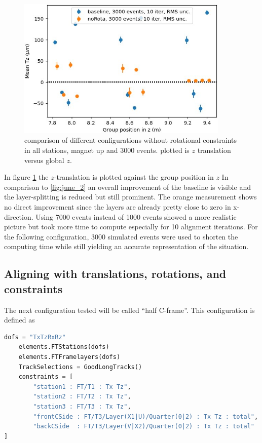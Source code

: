 \begin{figure}
  \centering
  \includegraphics[width=0.9\textwidth]{plots/renewed_plots/lxplus/4_4.jpeg}
  \caption{comparison of different configurations without rotational constraints in all stations, magnet up and 3000 events. plotted is $z$ translation versus global $z$.}
  \label{fig:june_2_1}
\end{figure}

In figure \ref{fig:june_2_1} the $z$-translation is plotted against the group position in $z$ In comparison to \ref{fig:june_2} an overall improvement of the baseline is visible and the layer-splitting is reduced but still prominent. The orange measurement shows no direct improvement since the layers are already pretty close to zero in x-direction.
Using 7000 events instead of 1000 events showed a more realistic picture but
took more time to compute especially for 10 alignment iterations.
For the following configuration, 3000 simulated events were used to shorten the computing time while still yielding an accurate representation of the situation.

\subsection{Aligning with translations, rotations, and constraints}
The next configuration tested will be called ``half C-frame''. This configuration is defined as

\begin{lstlisting}[language=Python]
    dofs = "TxTzRxRz"
    elements.FTStations(dofs)
    elements.FTFramelayers(dofs)
    TrackSelections = GoodLongTracks()
    constraints = [
        "station1 : FT/T1 : Tx Tz",
        "station2 : FT/T2 : Tx Tz",
        "station3 : FT/T3 : Tx Tz",
        "frontCSide : FT/T3/Layer(X1|U)/Quarter(0|2) : Tx Tz : total",
        "backCSide  : FT/T3/Layer(V|X2)/Quarter(0|2) : Tx Tz : total"
]
\end{lstlisting}

